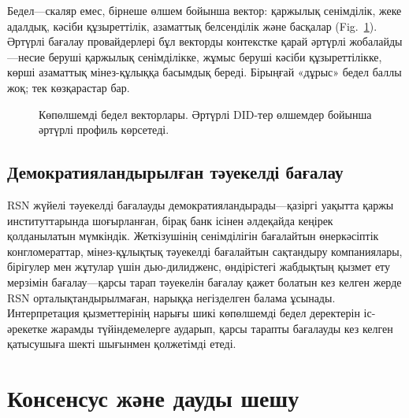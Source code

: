 \documentclass[11pt,a4paper,twocolumn]{article}
\begin{document}
Бедел---скаляр емес, бірнеше өлшем бойынша вектор: қаржылық сенімділік, жеке адалдық, кәсіби құзыреттілік, азаматтық белсенділік және басқалар (Fig.~\ref{fig:reputation-radar}). Әртүрлі бағалау провайдерлері бұл векторды контекстке қарай әртүрлі жобалайды---несие беруші қаржылық сенімділікке, жұмыс беруші кәсіби құзыреттілікке, көрші азаматтық мінез-құлыққа басымдық береді. Бірыңғай «дұрыс» бедел баллы жоқ; тек көзқарастар бар.

\begin{figure}[ht]
\centering
{}
\caption{Көпөлшемді бедел векторлары. Әртүрлі DID-тер өлшемдер бойынша әртүрлі профиль көрсетеді.}
\label{fig:reputation-radar}
\end{figure}

\subsection{Демократияландырылған тәуекелді бағалау}

RSN жүйелі тәуекелді бағалауды демократияландырады---қазіргі уақытта қаржы институттарында шоғырланған, бірақ банк ісінен әлдеқайда кеңірек қолданылатын мүмкіндік. Жеткізушінің сенімділігін бағалайтын өнеркәсіптік конгломераттар, мінез-құлықтық тәуекелді бағалайтын сақтандыру компаниялары, бірігулер мен жұтулар үшін дью-дилидженс, өндірістегі жабдықтың қызмет ету мерзімін бағалау---қарсы тарап тәуекелін бағалау қажет болатын кез келген жерде RSN орталықтандырылмаған, нарыққа негізделген балама ұсынады. Интерпретация қызметтерінің нарығы шикі көпөлшемді бедел деректерін іс-әрекетке жарамды түйіндемелерге аударып, қарсы тарапты бағалауды кез келген қатысушыға шекті шығынмен қолжетімді етеді.

\section{Консенсус және дауды шешу}
\end{document}
